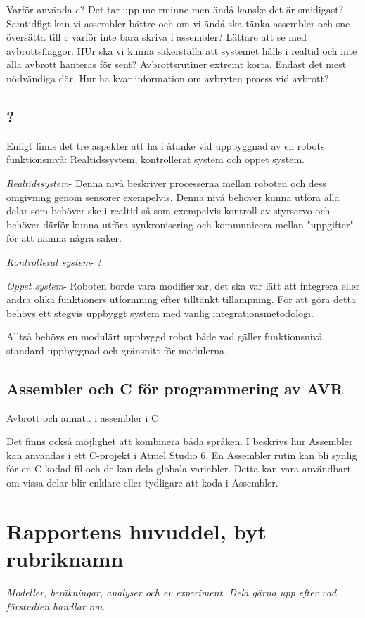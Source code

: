 \documentclass[11pt]{article}
\begin{document}
\begin{flushleft}
Varför använda c? Det tar upp me rminne men ändå kanske det är smidigast? Samtidfigt kan vi assembler bättre och om vi ändå ska tänka assembler och sne översätta till c varför inte bara skriva i assembler? Lättare att se med avbrottsflaggor.
HUr ska vi kunna säkerställa att systemet hålls i realtid och inte alla avbrott hanteras för sent? Avbrottsrutiner extremt korta. Endast det mest nödvändiga där. Hur ha kvar information om avbryten proess vid avbrott?

\subsection{?}
Enligt \cite{GenoM} finns det tre aspekter att ha i åtanke vid uppbyggnad av en robots funktionsnivå: Realtidssystem, kontrollerat system och öppet system. 

\textit{Realtidssystem}- Denna nivå beskriver processerna mellan roboten och dess omgivning genom sensorer exempelvis. Denna nivå behöver kunna utföra alla delar som behöver ske i realtid så som exempelvis kontroll av styrservo och behöver därför kunna utföra synkronisering och kommunicera mellan "uppgifter" för att nämna några saker. 

\textit{Kontrollerat system}- ?

\textit{Öppet system}- Roboten borde vara modifierbar, det ska var lätt att integrera eller ändra olika funktioners utformning efter tilltänkt tillämpning. För att göra detta behövs ett stegvis uppbyggt system med vanlig integrationsmetodologi. 

Alltså behövs en modulärt uppbyggd robot både vad gäller funktionsnivå, standard-uppbyggnad och gränsnitt för modulerna. 


\subsection{Assembler och C för programmering av AVR}

Avbrott och annat.. i assembler
i C

Det finns också möjlighet att kombinera båda språken. I \cite{AssC} beskrivs hur Assembler kan användas i ett C-projekt i Atmel Studio 6. En Assembler rutin kan bli synlig för en C kodad fil och de kan dela globala variabler. Detta kan vara användbart om vissa delar blir enklare eller tydligare att koda i Assembler.

\pagebreak

\section{Rapportens huvuddel, byt rubriknamn}
\textit{Modeller, beräkningar, analyser och ev experiment. Dela gärna upp efter vad förstudien handlar om.}


\end{flushleft}
\end{document}
